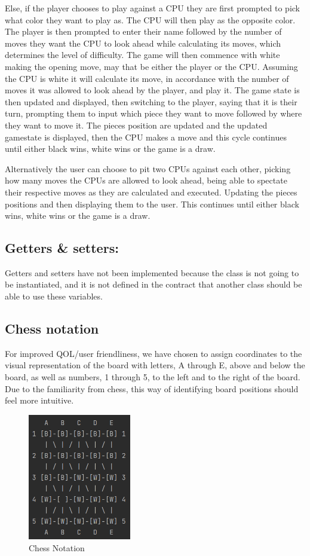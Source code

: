 \documentclass[12pt, a4paper]{article}
\begin{document}
	Else, if the player chooses to play against a CPU they are first prompted to pick what color they want to play as. The CPU will then play as the opposite color. The player is then prompted to enter their name followed by the number of moves they want the CPU to look ahead while calculating its moves, which determines the level of difficulty. The game will then commence with white making the opening move, may that be either the player or the CPU. Assuming the CPU is white it will calculate its move, in accordance with the number of moves it was allowed to look ahead by the player, and play it. The game state is then updated and displayed, then switching to the player, saying that it is their turn, prompting them to input which piece they want to move followed by where they want to move it. The pieces position are updated and the updated gamestate is displayed, then the CPU makes a move and this cycle continues until either black wins, white wins or the game is a draw. 
	
	Alternatively the user can choose to pit two CPUs against each other, picking how many moves the CPUs are allowed to look ahead, being able to spectate their respective moves as they are calculated and executed. Updating the pieces positions and then displaying them to the user. This continues until either black wins, white wins or the game is a draw.
	
	\subsection{Getters \& setters:}
	Getters and setters have not been implemented because the class is not going to be instantiated, and it is not defined in the contract that another class should be able to use these variables.	
	
	\subsection{Chess notation}
	For improved QOL/user friendliness, we have chosen to assign coordinates to the visual representation of the board with letters, A through E, above and below the board, as well as numbers, 1 through 5, to the left and to the right of the board. Due to the familiarity from chess, this way of identifying board positions should feel more intuitive.
	
	\newpage
	
	\begin{figure}[h]
		\centering
		\caption{Chess Notation}
		\includegraphics[width=0.4\textwidth]{chessnotation}		
	\end{figure}
	
\end{document}
